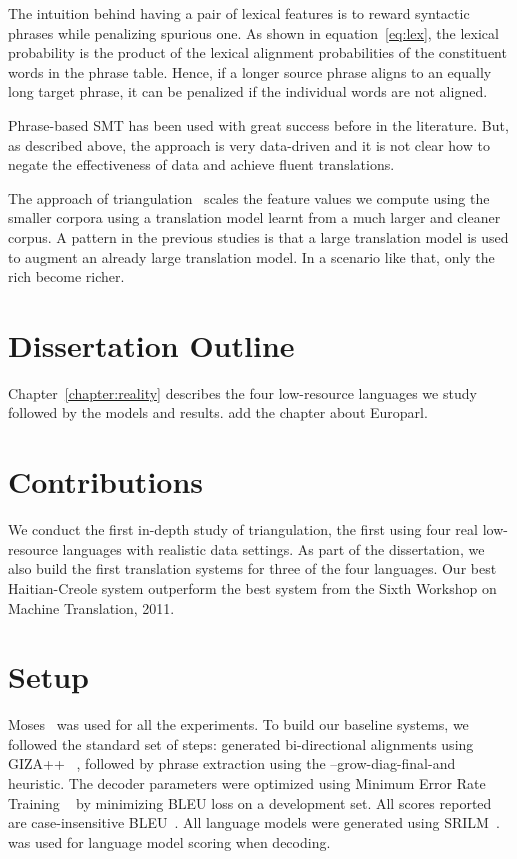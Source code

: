 The intuition behind having a pair of lexical features is to reward syntactic phrases while penalizing spurious one. As shown in equation~\eqref{eq:lex}, the lexical probability is the product of the lexical alignment probabilities of the constituent words in the phrase table. Hence, if a longer source phrase aligns to an equally long target phrase, it can be penalized if the individual words are not aligned. 

Phrase-based SMT has been used with great success before in the literature. But, as described above, the approach is very data-driven and it is not clear how to negate the effectiveness of data and achieve fluent translations. 

The approach of triangulation~\cite{Cohn:07,Utiyama:07,Nakov:12} scales the feature values we compute using the smaller corpora using a translation model learnt from a much larger and cleaner corpus. A pattern in the previous studies is that a large translation model is used to augment an already large translation model. In a scenario like that, only the rich become richer.  

\section{Dissertation Outline}
\label{sec:outline}
Chapter~\ref{chapter:reality} describes the four low-resource languages we study followed by the models and results. \alert{add the chapter about Europarl}.

\section{Contributions}
\label{sec:summary}
We conduct the first in-depth study of triangulation, the first using four real low-resource languages with realistic data settings. As part of the dissertation, we also build the first translation systems for three of the four languages. Our best Haitian-Creole system outperform the best system from the Sixth Workshop on Machine Translation, 2011. 


\section{Setup}
\label{sec:setup}


Moses~\cite{Koehn:07} was used for all the experiments. To build our baseline systems, we followed the standard set of steps: generated bi-directional alignments using GIZA++ ~\cite{OchNey:03}, followed by phrase extraction using the --grow-diag-final-and heuristic. The decoder parameters were optimized using Minimum Error Rate Training ~\cite{Och:03} by minimizing BLEU loss on a development set. All scores reported are case-insensitive BLEU~\cite{Papineni:02}. All language models were generated using SRILM~\cite{Stolcke:02}.~\cite{Ken:11} was used for language model scoring when decoding.